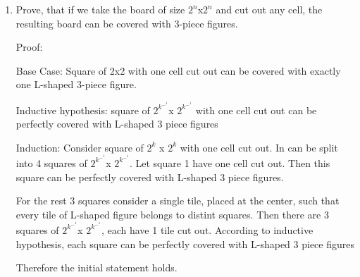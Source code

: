 \documentclass[12pt]{article}
\begin{document}
\begin{enumerate}
    (n+1) + (n+6) = 2n+7
    
    (n+2) + (n+5) = 2n+7
    
    (n+3) + (n+4) = 2n+7

    Each of these groups can be added to the set of weights \(\{1, 2, \dots, n\}\) such that weight $x = W + 2n + 7$. So if solution exists for n, it must exist for n+6, if $n >= 5$ and if $n \equiv 0 (mod 3)$ or $n \equiv 2 (mod 3)$

    Since the induction step jumps by +6, the 4 base cases are sufficient to cover all valid  remainders when dividing n by 6
    
    \(n \equiv 0 \pmod 6\): Covered by the \(n=6\) base case (generates \(12, 18, 24, \dots\))
    
    \(n \equiv 1 \pmod 6\): Invalid (violates \(n \equiv 0\) or \(2 \pmod 3\))

    \(n \equiv 2 \pmod 6\): Covered by the \(n=8\) base case (generates \(14, 20, 26, \dots\))
    
    \(n \equiv 3 \pmod 6\): Covered by the \(n=9\) base case (generates \(15, 21, 27, \dots\))
    
    \(n \equiv 4 \pmod 6\): Invalid (violates \(n \equiv 0\) or \(2 \pmod 3\))
    
    \(n \equiv 5 \pmod 6\): Covered by the \(n=5\) base case (generates \(11, 17, 23, \dots\))

    


    \item Prove, that if we take the board of size $2^n$x$2^n$ and cut out any cell, the resulting board can be covered with 3-piece figures.

    Proof:

    Base Case:
    Square of 2x2 with one cell cut out can be covered with exactly one L-shaped 3-piece figure.

    Inductive hypothesis: square of $2^k^-^1$x $2^k^-^1$ with one cell cut out can be perfectly covered with L-shaped 3 piece figures

    Induction: Consider square of $2^k$ x $2^k$ with one cell cut out. In can be split into 4 squares of $2^k^-^1$x $2^k^-^1$. Let square 1 have one cell cut out. Then this square can be perfectly covered with L-shaped 3 piece figures. 

    For the rest 3 squares consider a single tile, placed at the center, such that every tile of L-shaped figure belongs to distint squares. Then there are 3 squares of $2^k^-^1$x $2^k^-^1$, each have 1 tile cut out. According to inductive hypothesis, each square can be perfectly covered with L-shaped 3 piece figures

    Therefore the initial statement holds.

    


\end{enumerate}
\end{document}
